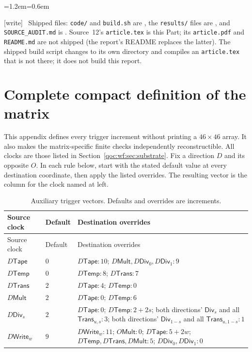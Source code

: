 \documentclass[11pt,letterpaper]{article}
\theoremstyle{definition}
\theoremstyle{remark}
\newcommand{\code}[1]{\nolinkurl{#1}}
\newcommand{\clk}[1]{\mathsf{#1}}
\newcommand{\wtag}{\textup{[write]}}
\newenvironment{writenote}{\par\smallskip\begin{list}{}{\leftmargin=1.2em\rightmargin=0.6em}\item[]\small\wtag\ }{\end{list}\smallskip}
\begin{document}
\begin{writenote}
Shipped files: \code{code/} and \code{build.sh} are , the \code{results/} files are , and \code{SOURCE_AUDIT.md} is . Source~12's \code{article.tex} is this Part; its \code{article.pdf} and \code{README.md} are not shipped (the report's README replaces the latter). The shipped build script changes to its own directory and compiles an \code{article.tex} that is not there; it does not build this report.
\end{writenote}


\section{Complete compact definition of the matrix}\label{qoc:wf:app:matrix}
This appendix defines every trigger increment without printing a $46\times46$ array. It also makes the matrix-specific finite checks independently reconstructible. All clocks are those listed in Section~\ref{qoc:wf:sec:substrate}. Fix a direction $D$ and its opposite $O$. In each rule below, start with the stated default value at every destination coordinate, then apply the listed overrides. The resulting vector is the column for the clock named at left.

\begin{longtable}{@{}p{}p{}>{\raggedright\arraybackslash}p{}@{}}
\caption{Auxiliary trigger vectors. Defaults and overrides are increments.}\label{qoc:wf:tab:matrix-aux}\\
\toprule
Source clock & Default & Destination overrides\\\midrule\endfirsthead
\toprule Source clock & Default & Destination overrides\\\midrule\endhead
$D\clk{Tape}$ & $0$ & $D\clk{Tape}:10$; $D\clk{Mult},D\clk{Div}_0,D\clk{Div}_1:9$\\[5pt]
$D\clk{Temp}$ & $0$ & $D\clk{Temp}:8$; $D\clk{Trans}:7$\\[5pt]
$D\clk{Trans}$ & $2$ & $D\clk{Tape}:4$; $D\clk{Temp}:0$\\[5pt]
$D\clk{Mult}$ & $2$ & $D\clk{Tape}:0$; $D\clk{Temp}:6$\\[5pt]
$D\clk{Div}_s$ & $2$ & $D\clk{Tape}:0$; $D\clk{Temp}:2+2s$; both directions' $\clk{Div}_s$ and all $\clk{Trans}_{u,s}:3$; both directions' $\clk{Div}_{1-s}$ and all $\clk{Trans}_{u,1-s}:1$\\[5pt]
$D\clk{Write}_w$ & $9$ & $D\clk{Write}_w:11$; $O\clk{Mult}:0$; $D\clk{Tape}:5+2w$; $D\clk{Temp},D\clk{Trans},D\clk{Mult}:5$; $D\clk{Div}_0,D\clk{Div}_1:0$\\\bottomrule
\end{longtable}
\end{document}
